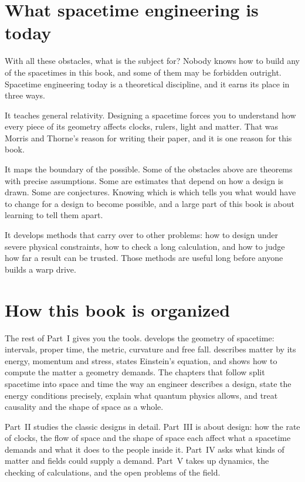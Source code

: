 \section{What spacetime engineering is today}\label{sec:today}

With all these obstacles, what is the subject for? Nobody knows how to build
any of the spacetimes in this book, and some of them may be forbidden outright.
Spacetime engineering today is a theoretical discipline, and it earns its place
in three ways.

It teaches general relativity. Designing a spacetime forces you to understand
how every piece of its geometry affects clocks, rulers, light and matter. That
was Morris and Thorne's reason for writing their paper, and it is one reason for
this book.

It maps the boundary of the possible. Some of the obstacles above are theorems
with precise assumptions. Some are estimates that depend on how a design is
drawn. Some are conjectures. Knowing which is which tells you what would have to
change for a design to become possible, and a large part of this book is about
learning to tell them apart.

It develops methods that carry over to other problems: how to design under
severe physical constraints, how to check a long calculation, and how to judge
how far a result can be trusted. Those methods are useful long before anyone
builds a warp drive.

\section{How this book is organized}\label{sec:organization}

The rest of Part~I gives you the tools.  develops the geometry
of spacetime: intervals, proper time, the metric, curvature and free fall.
 describes matter by its energy, momentum and stress,
states Einstein's equation, and shows how to compute the matter a geometry
demands. The chapters that follow split spacetime into space and time the way
an engineer describes a design, state the energy conditions precisely, explain
what quantum physics allows, and treat causality and the shape of space as a
whole.

Part~II studies the classic designs in detail. Part~III is about design: how
the rate of clocks, the flow of space and the shape of space each affect what a
spacetime demands and what it does to the people inside it. Part~IV asks what
kinds of matter and fields could supply a demand. Part~V takes up dynamics,
the checking of calculations, and the open problems of the field.

